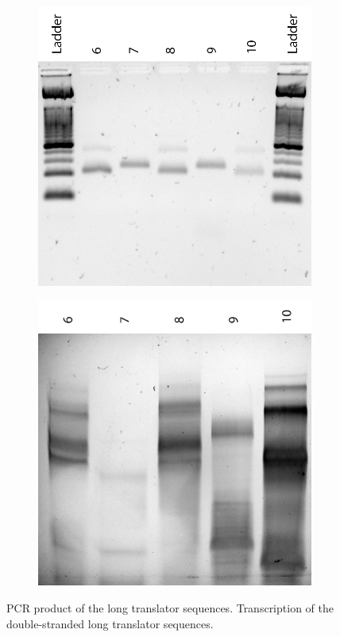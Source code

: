 \begin{figure}[h]
\begin{subfigure}[t]{0.53\textwidth}
  \includegraphics[width=\textwidth]{images/translator_pcr_long_1.png}
  \caption{}
  \label{translator_pcr_long_1}
\end{subfigure}
\begin{subfigure}[t]{0.47\textwidth}
  \includegraphics[width=\textwidth]{images/translator_transcription_long_ds_1.png}
  \caption{}
  \label{translator_transcription_long_ds_1}
\end{subfigure}
\caption{ PCR product of the long translator sequences.  Transcription of the double-stranded long translator sequences.}
\end{figure}
